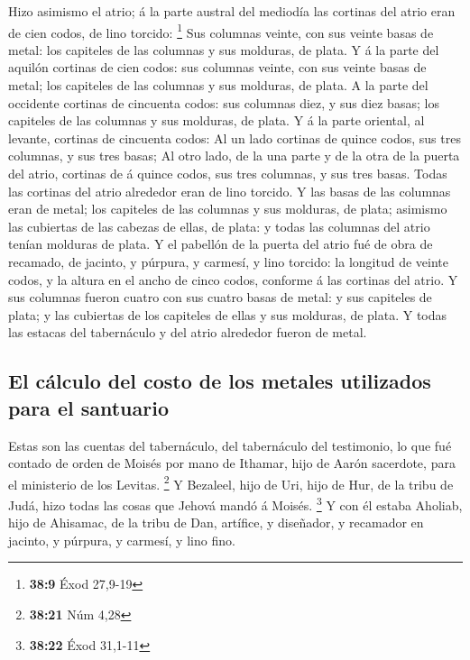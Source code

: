  Hizo asimismo el atrio; á la parte austral del mediodía las
cortinas del atrio eran de cien codos, de lino torcido: \footnote{\textbf{38:9}
  Éxod 27,9-19}  Sus columnas veinte, con sus veinte basas
de metal: los capiteles de las columnas y sus molduras, de plata.
 Y á la parte del aquilón cortinas de cien codos: sus
columnas veinte, con sus veinte basas de metal; los capiteles de las
columnas y sus molduras, de plata.  A la parte del
occidente cortinas de cincuenta codos: sus columnas diez, y sus diez
basas; los capiteles de las columnas y sus molduras, de plata.
 Y á la parte oriental, al levante, cortinas de cincuenta
codos:  Al un lado cortinas de quince codos, sus tres
columnas, y sus tres basas;  Al otro lado, de la una parte
y de la otra de la puerta del atrio, cortinas de á quince codos, sus
tres columnas, y sus tres basas.  Todas las cortinas del
atrio alrededor eran de lino torcido.  Y las basas de las
columnas eran de metal; los capiteles de las columnas y sus molduras, de
plata; asimismo las cubiertas de las cabezas de ellas, de plata: y todas
las columnas del atrio tenían molduras de plata.  Y el
pabellón de la puerta del atrio fué de obra de recamado, de jacinto, y
púrpura, y carmesí, y lino torcido: la longitud de veinte codos, y la
altura en el ancho de cinco codos, conforme á las cortinas del atrio.
 Y sus columnas fueron cuatro con sus cuatro basas de
metal: y sus capiteles de plata; y las cubiertas de los capiteles de
ellas y sus molduras, de plata.  Y todas las estacas del
tabernáculo y del atrio alrededor fueron de metal.

\hypertarget{el-cuxe1lculo-del-costo-de-los-metales-utilizados-para-el-santuario}{%
\subsection{El cálculo del costo de los metales utilizados para el
santuario}\label{el-cuxe1lculo-del-costo-de-los-metales-utilizados-para-el-santuario}}

 Estas son las cuentas del tabernáculo, del tabernáculo del
testimonio, lo que fué contado de orden de Moisés por mano de Ithamar,
hijo de Aarón sacerdote, para el ministerio de los Levitas. \footnote{\textbf{38:21}
  Núm 4,28}  Y Bezaleel, hijo de Uri, hijo de Hur, de la
tribu de Judá, hizo todas las cosas que Jehová mandó á Moisés.
\footnote{\textbf{38:22} Éxod 31,1-11}  Y con él estaba
Aholiab, hijo de Ahisamac, de la tribu de Dan, artífice, y diseñador, y
recamador en jacinto, y púrpura, y carmesí, y lino fino.

